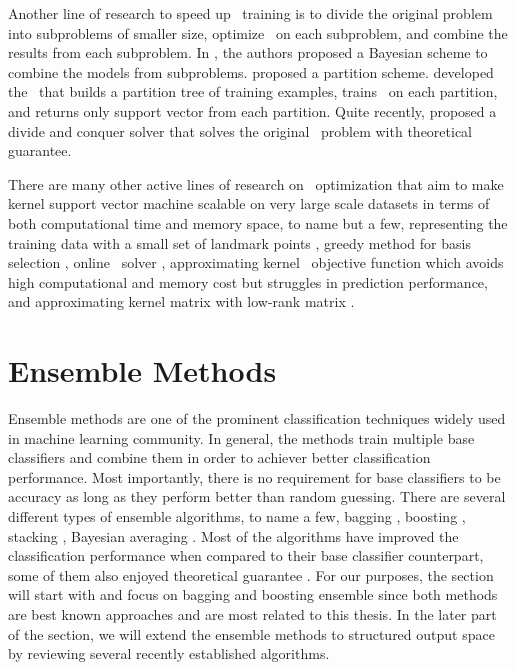 {Another line of research to speed up \svm\ training is to divide the original problem into subproblems of smaller size, optimize \svm\ on each subproblem, and combine the results from each subproblem.
In \citep{Tresp00a,Schwaighofer01the}, the authors proposed a Bayesian scheme to combine the models from subproblems.
\citet{Collobert02a} proposed a partition scheme.
\citet{Graf05parallel} developed the \svmcascade\ that builds a partition tree of training examples, trains \svm\ on each partition, and returns only support vector from each partition.
Quite recently, \citet{Hsieh14a} proposed a divide and conquer solver that solves the original \svm\ problem with theoretical guarantee.

There are many other active lines of research on \svm\ optimization that aim to make kernel support vector machine scalable on very large scale datasets in terms of both computational time and memory space, to name but a few, representing the training data with a small set of landmark points \citep{Pavlov00towards,Boley04training,Yu05making,Zhang08improved}, greedy method for basis selection \citep{Keerthi06building}, online \svm\ solver \citep{Bordes05fast}, approximating kernel \svm\ objective function \citep{Zhang12scaling, Le13fast} which avoids high computational and memory cost but struggles in prediction performance, and approximating kernel matrix with low-rank matrix \citep{Smola00sparse,Fine02efficient,Drineas05on,Si14memory}.



%
%
%
\section{Ensemble Methods} \label{sc_em}

Ensemble methods are one of the prominent classification techniques widely used in machine learning community.
In general, the methods train multiple base classifiers and combine them in order to achiever better classification performance.
Most importantly, there is no requirement for base classifiers to be accuracy as long as they perform better than random guessing.
There are several different types of ensemble algorithms, to name a few, bagging \citep{Breiman96bagging}, boosting \citep{Freund97a,Schapire99improved}, stacking \citep{Smyth99linearly}, Bayesian averaging \citep{Freund04generalization}.
Most of the algorithms have improved the classification performance when compared to their base classifier counterpart, some of them also enjoyed theoretical guarantee \citep{Schapire97boosting,Koltchinskii00empirical,Cortes14semble,Cortes14deep}.
For our purposes, the section will start with and focus on bagging and boosting ensemble since both methods are best known approaches and are most related to this thesis.
In the later part of the section, we will extend the ensemble methods to structured output space by reviewing several recently established algorithms.


}

